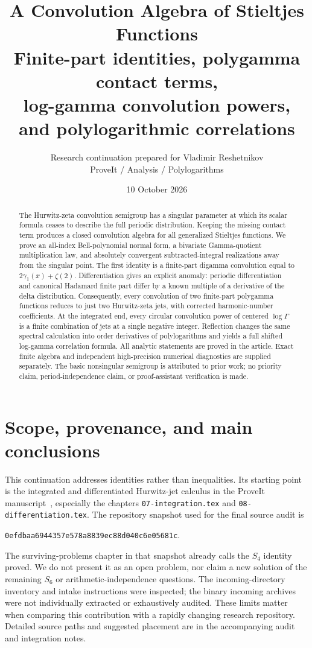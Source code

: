 \documentclass[11pt]{article}
\title{A Convolution Algebra of Stieltjes Functions\\[4pt]
\large Finite-part identities, polygamma contact terms,\\log-gamma convolution powers, and polylogarithmic correlations}
\author{Research continuation prepared for Vladimir Reshetnikov\\\small ProveIt / Analysis / Polylogarithms}
\date{10 October 2026}
\numberwithin{equation}{section}
\theoremstyle{definition}
\theoremstyle{remark}
\newcommand{\pin}{\texttt{0efdbaa6944357e578a8839ec88d040c6e05681c}}
\begin{document}
\maketitle
\begin{abstract}
The Hurwitz-zeta convolution semigroup has a singular parameter at which
its scalar formula ceases to describe the full periodic distribution. Keeping
the missing contact term produces a closed convolution algebra for all
generalized Stieltjes functions. We prove an all-index Bell-polynomial
normal form, a bivariate Gamma-quotient multiplication law, and absolutely
convergent subtracted-integral realizations away from the singular point.
The first identity is a finite-part digamma convolution equal to
$2\gamma_1(x)+\zeta(2)$. Differentiation gives an explicit anomaly:
periodic differentiation and canonical Hadamard finite part differ by a
known multiple of a derivative of the delta distribution. Consequently,
every convolution of two finite-part polygamma functions reduces to just
two Hurwitz-zeta jets, with corrected harmonic-number coefficients.
At the integrated end, every circular convolution power of centered
$\log\Gamma$ is a finite combination of jets at a single negative integer.
Reflection changes the same spectral calculation into order derivatives
of polylogarithms and yields a full shifted log-gamma correlation formula.
All analytic statements are proved in the article. Exact finite algebra
and independent high-precision numerical diagnostics are supplied separately.
The basic nonsingular semigroup is attributed to prior work; no priority
claim, period-independence claim, or proof-assistant verification is made.
\end{abstract}

\clearpage
\tableofcontents
\clearpage

\section{Scope, provenance, and main conclusions}
\label{sec:scope}
This continuation addresses identities rather than inequalities. Its
starting point is the integrated and differentiated Hurwitz-jet calculus
in the ProveIt manuscript~\cite{ProveIt}, especially the chapters
\texttt{07-integration.tex} and \texttt{08-differentiation.tex}.
The repository snapshot used for the final source audit is
\begin{center}\small\pin.\end{center}
The surviving-problems chapter in that snapshot already calls the
$S_4$ identity proved. We do not present it as an open problem, nor claim a
new solution of the remaining $S_6$ or arithmetic-independence questions.
The incoming-directory inventory and intake instructions were inspected;
the binary incoming archives were not individually extracted or
exhaustively audited. These limits matter when comparing this contribution
with a rapidly changing research repository. Detailed source paths and
suggested placement are in the accompanying audit and integration notes.
\end{document}
